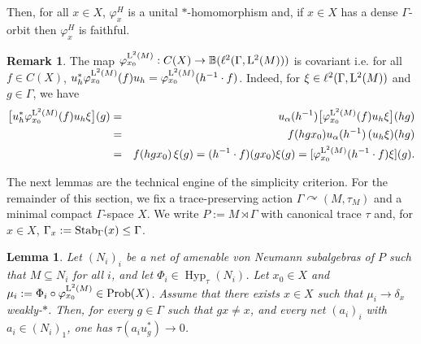 \documentclass[12pt]{amsart} %
\theoremstyle{plain}
\newtheorem{lemma}[theorem]{Lemma}
\theoremstyle{definition}
\newtheorem{remark}[theorem]{Remark}
\newcommand{\Lcal}{\mathbb{B}}
\DeclareMathOperator{\Prob}{Prob}
\DeclareMathOperator{\Hyp}{Hyp}
\begin{document}
\noindent Then, for all $x\in X$, $\varphi_x^H$ is a unital $*$-homomorphism and, if $x\in X$ has a dense $\Gamma$-orbit then $\varphi_x^H$ is faithful.
\begin{remark}\label{RmkCovariant} The map $\varphi_{x_0}^{{\rm L}^2(M)}:C(X)\rightarrow \Lcal(\ell^2(\Gamma, {\rm L}^2(M)))$ is covariant i.e. for all $f\in C(X)$,
$u_h^*\varphi_{x_0}^{{\rm L}^2(M)}(f)u_h
=\varphi_{x_0}^{{\rm L}^2(M)}(h^{-1}\cdot f)$. Indeed, for \(\xi\in \ell^2(\Gamma,{\rm L}^2(M))\) and \(g\in \Gamma\), we have
\begin{eqnarray*}
\bigl[u_h^*\varphi_{x_0}^{{\rm L}^2(M)}(f)u_h\xi\bigr](g)
&=&
u_\alpha(h^{-1})\bigl[\varphi_{x_0}^{{\rm L}^2(M)}(f)u_h\xi\bigr](hg)\\
&=&
f(hgx_0)u_\alpha(h^{-1})\,(u_h\xi)(hg)\\
&=&
f(hgx_0)\,\xi(g)=(h^{-1}\cdot f)(gx_0)\xi(g)=[\varphi_{x_0}^{{\rm L}^2(M)}(h^{-1}\cdot f)\xi](g).
\end{eqnarray*}
\end{remark}
\noindent The next lemmas are the technical engine of the simplicity criterion. For the remainder of this section, we fix a trace-preserving action $\Gamma\curvearrowright(M,\tau_M)$ and a minimal compact $\Gamma$-space $X$. We write $P:=M\rtimes\Gamma$ with canonical trace $\tau$ and, for $x\in X$, $\Gamma_x:={\rm Stab}_\Gamma(x)\leq\Gamma$.
\begin{lemma}\label{LemmaFourier}\label{LemApproxBoundaryVanishing}
Let $(N_i)_i$ be a net of amenable von Neumann subalgebras of $P$ such that $M\subseteq N_i$ for all $i$, and let $\Phi_i\in \Hyp_\tau(N_i)$. Let $x_0\in X$ and $\mu_i:=\Phi_i\circ\varphi_{x_0}^{{\rm L}^2(M)}\in \Prob(X)$. Assume that there exists $x\in X$ such that $\mu_i\to \delta_x$ weakly-$*$. Then, for every $g\in \Gamma$ such that $gx\neq x$, and every net $(a_i)_i$ with $a_i\in (N_i)_1$, one has $\tau(a_i u_g^*)\to 0$.
\end{lemma}
\end{document}
